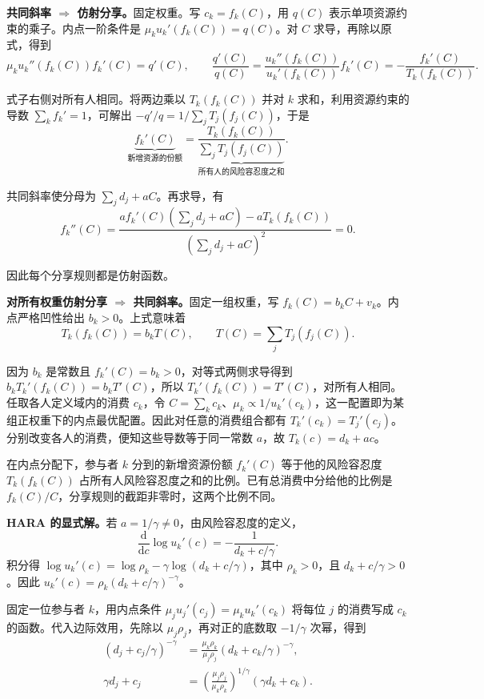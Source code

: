 \begin{solution}[label-content={证明},blank-type=none]
\textbf{共同斜率 $\Rightarrow$ 仿射分享。}固定权重。写 $c_k=f_k(C)$，用 $q(C)$ 表示单项资源约束的乘子。内点一阶条件是 $\mu_k u_k'(f_k(C))=q(C)$。对 $C$ 求导，再除以原式，得到
\[
 \mu_k u_k''(f_k(C))f_k'(C)=q'(C),\qquad
 \frac{q'(C)}{q(C)}
 =\frac{u_k''(f_k(C))}{u_k'(f_k(C))}f_k'(C)
 =-\frac{f_k'(C)}{T_k(f_k(C))}.
\]

式子右侧对所有人相同。将两边乘以 $T_k(f_k(C))$ 并对 $k$ 求和，利用资源约束的导数 $\sum_kf_k'=1$，可解出 $-q'/q=1/\sum_jT_j(f_j(C))$，于是
\[
 \underbrace{f_k'(C)}_{\text{新增资源的份额}}
 =\frac{T_k(f_k(C))}
        {\underbrace{\sum_jT_j(f_j(C))}_{\text{所有人的风险容忍度之和}}}.
\]

共同斜率使分母为 $\sum_jd_j+aC$。再求导，有
\[
 f_k''(C)=
 \frac{a f_k'(C)(\sum_jd_j+aC)-aT_k(f_k(C))}
 {(\sum_jd_j+aC)^2}=0.
\]

因此每个分享规则都是仿射函数。

\textbf{对所有权重仿射分享 $\Rightarrow$ 共同斜率。}固定一组权重，写 $f_k(C)=b_kC+v_k$。内点严格凹性给出 $b_k>0$。上式意味着
\[
 T_k(f_k(C))=b_kT(C),\qquad T(C)=\sum_jT_j(f_j(C)).
\]

因为 $b_k$ 是常数且 $f_k'(C)=b_k>0$，对等式两侧求导得到 $b_kT_k'(f_k(C))=b_kT'(C)$，所以 $T_k'(f_k(C))=T'(C)$，对所有人相同。任取各人定义域内的消费 $c_k$，令 $C=\sum_kc_k$、$\mu_k\propto1/u_k'(c_k)$，这一配置即为某组正权重下的内点最优配置。因此对任意的消费组合都有 $T_k'(c_k)=T_j'(c_j)$。分别改变各人的消费，便知这些导数等于同一常数 $a$，故 $T_k(c)=d_k+a c$。
\end{solution}

在内点分配下，参与者 $k$ 分到的新增资源份额 $f_k'(C)$ 等于他的风险容忍度 $T_k(f_k(C))$ 占所有人风险容忍度之和的比例。已有总消费中分给他的比例是 $f_k(C)/C$，分享规则的截距非零时，这两个比例不同。

\textbf{HARA 的显式解。}若 $a=1/\gamma\ne0$，由风险容忍度的定义，
\[
 \frac{\mathrm d}{\mathrm dc}\log u_k'(c)
 =-\frac{1}{d_k+c/\gamma}.
\]
积分得 $\log u_k'(c)=\log\rho_k-\gamma\log(d_k+c/\gamma)$，其中 $\rho_k>0$，且 $d_k+c/\gamma>0$。因此 $u_k'(c)=\rho_k(d_k+c/\gamma)^{-\gamma}$。

固定一位参与者 $k$，用内点条件 $\mu_j u_j'(c_j)=\mu_k u_k'(c_k)$ 将每位 $j$ 的消费写成 $c_k$ 的函数。代入边际效用，先除以 $\mu_j\rho_j$，再对正的底数取 $-1/\gamma$ 次幂，得到
\[
 \begin{aligned}
 (d_j+c_j/\gamma)^{-\gamma}
 &=\frac{\mu_k\rho_k}{\mu_j\rho_j}(d_k+c_k/\gamma)^{-\gamma},\\
 \gamma d_j+c_j
 &=\left(\frac{\mu_j\rho_j}{\mu_k\rho_k}\right)^{1/\gamma}
      (\gamma d_k+c_k).
 \end{aligned}
\]

